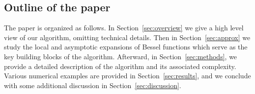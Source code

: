 \subsection*{Outline of the paper}

The paper is organized as follows. In Section~\ref{sec:overview} we give a high
level view of our algorithm, omitting technical details. Then in
Section~\ref{sec:approx} we study the local and asymptotic expansions of Bessel
functions which serve as the key building blocks of the algorithm. Afterward, in
Section~\ref{sec:methods}, we provide a detailed description of the algorithm
and its associated complexity. Various numerical examples are provided in
Section~\ref{sec:results}, and we conclude with some additional discussion in
Section~\ref{sec:discussion}.




